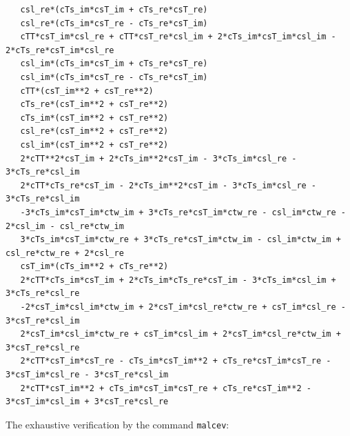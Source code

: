 \documentclass[
  10pt,
]{article}
\begin{document}
\begin{verbatim}
   csl_re*(cTs_im*csT_im + cTs_re*csT_re)
   csl_re*(cTs_im*csT_re - cTs_re*csT_im)
   cTT*csT_im*csl_re + cTT*csT_re*csl_im + 2*cTs_im*csT_im*csl_im - 2*cTs_re*csT_im*csl_re
   csl_im*(cTs_im*csT_im + cTs_re*csT_re)
   csl_im*(cTs_im*csT_re - cTs_re*csT_im)
   cTT*(csT_im**2 + csT_re**2)
   cTs_re*(csT_im**2 + csT_re**2)
   cTs_im*(csT_im**2 + csT_re**2)
   csl_re*(csT_im**2 + csT_re**2)
   csl_im*(csT_im**2 + csT_re**2)
   2*cTT**2*csT_im + 2*cTs_im**2*csT_im - 3*cTs_im*csl_re - 3*cTs_re*csl_im
   2*cTT*cTs_re*csT_im - 2*cTs_im**2*csT_im - 3*cTs_im*csl_re - 3*cTs_re*csl_im
   -3*cTs_im*csT_im*ctw_im + 3*cTs_re*csT_im*ctw_re - csl_im*ctw_re - 2*csl_im - csl_re*ctw_im
   3*cTs_im*csT_im*ctw_re + 3*cTs_re*csT_im*ctw_im - csl_im*ctw_im + csl_re*ctw_re + 2*csl_re
   csT_im*(cTs_im**2 + cTs_re**2)
   2*cTT*cTs_im*csT_im + 2*cTs_im*cTs_re*csT_im - 3*cTs_im*csl_im + 3*cTs_re*csl_re
   -2*csT_im*csl_im*ctw_im + 2*csT_im*csl_re*ctw_re + csT_im*csl_re - 3*csT_re*csl_im
   2*csT_im*csl_im*ctw_re + csT_im*csl_im + 2*csT_im*csl_re*ctw_im + 3*csT_re*csl_re
   2*cTT*csT_im*csT_re - cTs_im*csT_im**2 + cTs_re*csT_im*csT_re - 3*csT_im*csl_re - 3*csT_re*csl_im
   2*cTT*csT_im**2 + cTs_im*csT_im*csT_re + cTs_re*csT_im**2 - 3*csT_im*csl_im + 3*csT_re*csl_re
\end{verbatim}

The exhaustive verification by the command \texttt{malcev}:
\end{document}
